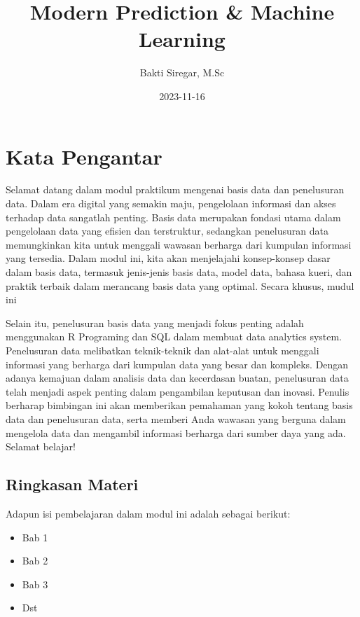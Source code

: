 \documentclass[
]{book}
\title{Modern Prediction \& Machine Learning}
\author{Bakti Siregar, M.Sc}
\date{2023-11-16}
\providecommand{\tightlist}{%
  \setlength{\itemsep}{0pt}\setlength{\parskip}{0pt}}
\begin{document}
\maketitle

{
\setcounter{tocdepth}{1}
\tableofcontents
}
\hypertarget{kata-pengantar}{%
\chapter*{Kata Pengantar}\label{kata-pengantar}}

Selamat datang dalam modul praktikum mengenai basis data dan penelusuran data. Dalam era digital yang semakin maju, pengelolaan informasi dan akses terhadap data sangatlah penting. Basis data merupakan fondasi utama dalam pengelolaan data yang efisien dan terstruktur, sedangkan penelusuran data memungkinkan kita untuk menggali wawasan berharga dari kumpulan informasi yang tersedia. Dalam modul ini, kita akan menjelajahi konsep-konsep dasar dalam basis data, termasuk jenis-jenis basis data, model data, bahasa kueri, dan praktik terbaik dalam merancang basis data yang optimal. Secara khusus, mudul ini

Selain itu, penelusuran basis data yang menjadi fokus penting adalah menggunakan R Programing dan SQL dalam membuat data analytics system. Penelusuran data melibatkan teknik-teknik dan alat-alat untuk menggali informasi yang berharga dari kumpulan data yang besar dan kompleks. Dengan adanya kemajuan dalam analisis data dan kecerdasan buatan, penelusuran data telah menjadi aspek penting dalam pengambilan keputusan dan inovasi. Penulis berharap bimbingan ini akan memberikan pemahaman yang kokoh tentang basis data dan penelusuran data, serta memberi Anda wawasan yang berguna dalam mengelola data dan mengambil informasi berharga dari sumber daya yang ada. Selamat belajar!

\hypertarget{ringkasan-materi}{%
\section*{Ringkasan Materi}\label{ringkasan-materi}}

Adapun isi pembelajaran dalam modul ini adalah sebagai berikut:

\begin{itemize}
\tightlist
\item
  Bab 1
\item
  Bab 2
\item
  Bab 3
\item
  Dst
\end{itemize}
\end{document}
